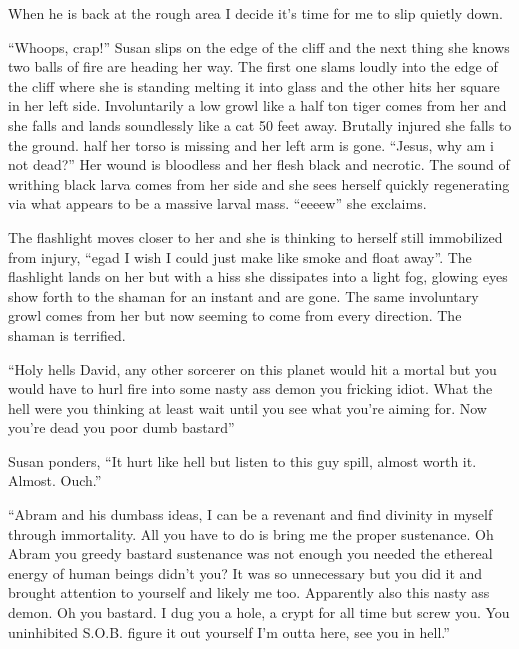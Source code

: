 When he is back at the rough area I decide it's time for me to slip quietly down. 

``Whoops, crap!'' Susan slips on the edge of the cliff and the next thing she knows two balls of fire are heading her way. The first one slams loudly into the edge of the cliff where she is standing melting it into glass and the other hits her square in her left side. Involuntarily a low growl like a half ton tiger comes from her and she falls and lands soundlessly like a cat 50 feet away. Brutally injured she falls to the ground. half her torso is missing and her left arm is gone. ``Jesus, why am i not dead?'' Her wound is bloodless and her flesh black and necrotic. The sound of writhing black larva comes from her side and she sees herself quickly regenerating via what appears to be a massive larval mass. ``eeeew'' she exclaims.

The flashlight moves closer to her and she is thinking to herself still immobilized from injury, ``egad I wish I could just make like smoke and float away''. The flashlight lands on her but with a hiss she dissipates into a light fog, glowing eyes show forth to the shaman for an instant and are gone. The same involuntary growl comes from her but now seeming to come from every direction. The shaman is terrified.

``Holy hells David, any other sorcerer on this planet would hit a mortal but you would have to hurl fire into some nasty ass demon you fricking idiot. What the hell were you thinking at least wait until you see what you're aiming for. Now you're dead you poor dumb bastard''

Susan ponders, ``It hurt like hell but listen to this guy spill, almost worth it. Almost. Ouch.''

``Abram and his dumbass ideas, I can be a revenant and find divinity in myself through immortality. All you have to do is bring me the proper sustenance. Oh Abram you greedy bastard sustenance was not enough you needed the ethereal energy of human beings didn't you? It was so unnecessary but you did it and brought attention to yourself and likely me too. Apparently also this nasty ass demon. Oh you bastard. I dug you a hole, a crypt for all time but screw you. You uninhibited S.O.B. figure it out yourself I'm outta here, see you in hell.''

